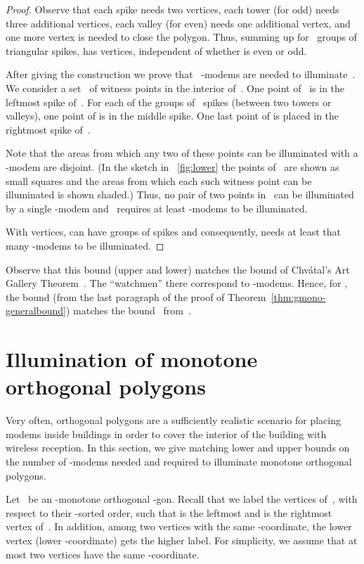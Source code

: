 \documentclass[A4]{article}
\begin{document}
\begin{proof}
Observe that each spike needs two vertices, each tower (for  odd) needs three additional vertices, each valley (for  even) needs one additional vertex, and one more vertex is needed to close the polygon. 
Thus, summing up for~ groups of triangular spikes,  has  vertices, independent of whether  is even or odd.



After giving the construction we prove that~ \mbox{-modems} are needed to illuminate~.
We consider a set~ of witness points in the interior of~.
One point of~ is in the leftmost spike of~.
For each of the \mbox{} groups of ~spikes (between two towers or valleys), one point of  is in the middle spike.
One last point of  is placed in the rightmost spike of~.

Note that the areas from which any two of these points can be illuminated with a \mbox{-modem} are disjoint.
(In the sketch in \figurename~\ref{fig:lower} the points of~ are shown as small squares and the areas from which each such witness point can be illuminated is shown shaded.)
Thus, no pair of two points in~ can be illuminated by a single \mbox{-modem} and~ requires at least  \mbox{-modems} to be illuminated. 

With  vertices,  can have  groups of spikes and consequently, needs at least that many \mbox{-modems} to be illuminated. \end{proof}


Observe that this bound (upper and lower) matches the bound of Chv\'atal's Art Gallery Theorem~\cite{Chvatal}.
The ``watchmen'' there correspond to \mbox{-modems}.
Hence, for , the bound  (from the last paragraph of the proof of Theorem~\ref{thm:gmono-generalbound}) matches the bound~ from~\cite{Chvatal}.




\section{Illumination of monotone orthogonal polygons}\label{sec:monoortho}

Very often, orthogonal polygons are a sufficiently realistic scenario for placing modems inside buildings in order to cover the interior of the building with wireless reception.
In this section, we give matching lower and upper bounds on the number of \mbox{-modems} needed and required to illuminate monotone orthogonal polygons.

Let~ be an -monotone orthogonal -gon.
Recall that we label the vertices of~,  with respect to their -sorted order, such that  is the leftmost and  is the rightmost vertex of~. In addition, among two vertices with the same -coordinate, the lower vertex (lower -coordinate) gets the higher label. 
For simplicity, we assume that at most two vertices have the same -coordinate.
\end{document}
